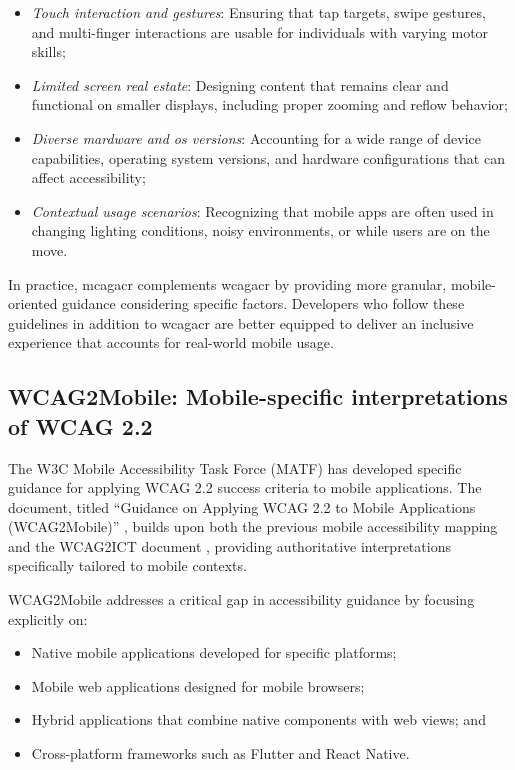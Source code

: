 \begin{itemize}
    \item \textit{Touch interaction and gestures}: Ensuring that tap targets, swipe gestures, and multi-finger interactions are usable for individuals with varying motor skills;
    
    \item \textit{Limited screen real estate}: Designing content that remains clear and functional on smaller displays, including proper zooming and reflow behavior;

    \item \textit{Diverse mardware and os versions}: Accounting for a wide range of device capabilities, operating system versions, and hardware configurations that can affect accessibility;

    \item \textit{Contextual usage scenarios}: Recognizing that mobile apps are often used in changing lighting conditions, noisy environments, or while users are on the move.
    
\end{itemize}

In practice, \acrshort{mcagacr} complements \acrshort{wcagacr} by providing more granular, mobile-oriented guidance considering specific factors. Developers who follow these guidelines in addition to \acrshort{wcagacr} are better equipped to deliver an inclusive experience that accounts for real-world mobile usage. 

\subsection{WCAG2Mobile: Mobile-specific interpretations of WCAG 2.2}
\label{subsec:wcag2mobile}

The W3C Mobile Accessibility Task Force (MATF) has developed specific guidance for applying WCAG 2.2 success criteria to mobile applications. The document, titled ``Guidance on Applying WCAG 2.2 to Mobile Applications (WCAG2Mobile)'' \cite{w3c-wcag2mobile}, builds upon both the previous mobile accessibility mapping \cite{mobile-accessibility-mapping} and the WCAG2ICT document \cite{wcag2ict-22}, providing authoritative interpretations specifically tailored to mobile contexts.

WCAG2Mobile addresses a critical gap in accessibility guidance by focusing explicitly on:

\begin{itemize}
    \item Native mobile applications developed for specific platforms;
    \item Mobile web applications designed for mobile browsers;
    \item Hybrid applications that combine native components with web views; and
    \item Cross-platform frameworks such as Flutter and React Native.
\end{itemize}


